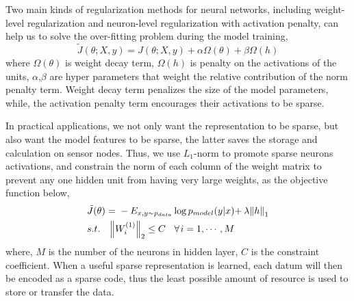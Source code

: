 Two main kinds of regularization methods for neural networks, including weight-level regularization and neuron-level regularization with activation penalty, can help us to solve the over-fitting problem during the model training\cite{goodfellow2016deep},
\begin{equation}
\tilde J(\theta ;X,y) = J(\theta ;X,y) + \alpha \Omega (\theta )+ \beta \Omega (h)
\end{equation}
where $\Omega (\theta )$ is weight decay term, $\Omega (h)$ is penalty on the activations of the units, $\alpha$,$\beta$ are hyper parameters that weight the relative contribution of
the norm penalty term. Weight decay term penalizes the size of the model parameters, while, the activation penalty term encourages their activations to be sparse.

In practical applications, we not only want the representation to be sparse, but also want the model features to be sparse, the latter saves the storage and calculation on sensor nodes. Thus, we use $L_{1}$-norm to promote sparse neurons activations, and constrain the norm of each column of the weight matrix to prevent any one hidden unit from having very large weights, as the objective function below,
\begin{equation}
\begin{split}
&\tilde J(\theta ){\kern 1pt} {\kern 1pt} {\kern 1pt} {\rm{ = }}{\kern 1pt} {\kern 1pt} {\kern 1pt}  - {E_{x,y \sim {p_{data}}}}\log {p_{model}}(y|x){\rm{ + }}{\kern 1pt} {\kern 1pt} \lambda {\left\| h \right\|_1}\\
& s.t.{\kern 1pt} {\kern 1pt} {\kern 1pt} {\kern 1pt} {\kern 1pt} {\kern 1pt} {\kern 1pt} {\kern 1pt} {\kern 1pt} {\kern 1pt} {\left\| {{W^{(1)}_i}} \right\|_2} \le C{\kern 1pt} {\kern 1pt} {\kern 1pt} {\kern 1pt} {\kern 1pt} {\kern 1pt} {\kern 1pt} {\kern 1pt} {\kern 1pt} \forall {\kern 1pt} i = 1, \cdots ,M\\
\end{split}
\end{equation}
where, $M$ is the number of the neurons in hidden layer, $C$ is the constraint coefficient.
When a useful sparse representation is learned, each datum will then be encoded as a sparse code, thus the least possible amount of resource is used to store or transfer the data.

